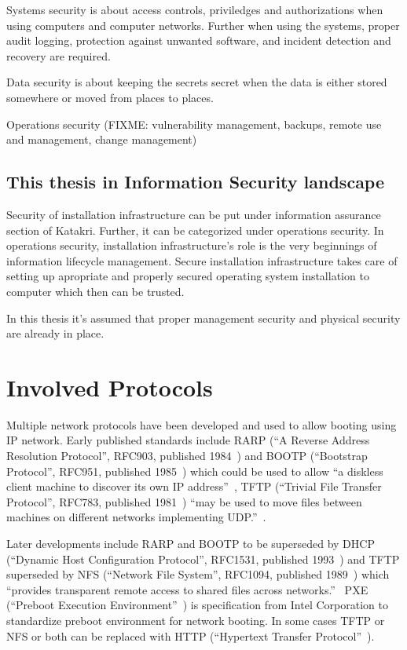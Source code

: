 Systems security is about access controls, priviledges and
authorizations when using computers and computer networks. Further
when using the systems, proper audit logging, protection against
unwanted software, and incident detection and recovery are required.

Data security is about keeping the secrets secret when the data is
either stored somewhere or moved from places to places.

Operations security (FIXME: vulnerability management, backups, remote
use and management, change management)


\subsection{This thesis in Information Security landscape}

Security of installation infrastructure can be put under information
assurance section of Katakri. Further, it can be categorized under
operations security. In operations security, installation
infrastructure's role is the very beginnings of information lifecycle
management. Secure installation infrastructure takes care of setting
up apropriate and properly secured operating system installation to
computer which then can be trusted.

In this thesis it's assumed that proper management security and
physical security are already in place.


\section{Involved Protocols}

Multiple network protocols have been developed and used to allow
booting using IP network. Early published standards include RARP (``A
Reverse Address Resolution Protocol'', RFC903, published
1984~\cite{RFC903}) and BOOTP (``Bootstrap Protocol'', RFC951,
published 1985~\cite{RFC951}) which could be used to allow ``a
diskless client machine to discover its own IP
address''~\cite{RFC951}, TFTP (``Trivial File Transfer Protocol'',
RFC783, published 1981~\cite{RFC783}) ``may be used to move files
between machines on different networks implementing
UDP.''~\cite{RFC783}.

Later developments include RARP and BOOTP to be superseded by DHCP
(``Dynamic Host Configuration Protocol'', RFC1531, published
1993~\cite{RFC1531}) and TFTP superseded by NFS (``Network File
System'', RFC1094, published 1989~\cite{RFC1094}) which ``provides
transparent remote access to shared files across
networks.''~\cite{RFC1094} PXE (``Preboot Execution
Environment''~\cite{PXEspec}) is specification from Intel Corporation
to standardize preboot environment for network booting. In some cases
TFTP or NFS or both can be replaced with HTTP (``Hypertext Transfer
Protocol''~\cite{RFC1945}\cite{RFC2616}).


